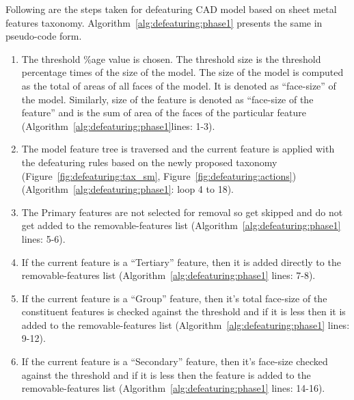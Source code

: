 
Following are the steps taken for defeaturing CAD model based on sheet metal features taxonomy. Algorithm~\ref{alg:defeaturing:phase1} presents the same in pseudo-code form.

\begin{enumerate}
[noitemsep,topsep=2pt,parsep=2pt,partopsep=2pt]
\item The threshold \%age value is chosen. The threshold size is the threshold percentage times of the size of the model. The size of the model  is computed as the total of areas of all faces of the model. It is denoted as ``face-size'' of the model. Similarly, size of the feature is denoted as ``face-size of the feature'' and is the sum of area of the faces of the particular feature (Algorithm~\ref{alg:defeaturing:phase1}lines: 1-3).
\item The model feature tree is traversed and the current feature is applied with the defeaturing rules based on the newly proposed taxonomy (Figure~\ref{fig:defeaturing:tax_sm}, Figure~\ref{fig:defeaturing:actions}) (Algorithm~\ref{alg:defeaturing:phase1}: loop 4 to 18). 
\item The Primary features are not selected for removal so get skipped and do not get added to the removable-features list  (Algorithm~\ref{alg:defeaturing:phase1} lines: 5-6).
\item If the current feature is a ``Tertiary'' feature, then it is added directly to the removable-features list (Algorithm~\ref{alg:defeaturing:phase1} lines: 7-8).
\item If the current feature is a ``Group'' feature, then it's total face-size of the constituent features is checked against the threshold and if it is less then it is added to the removable-features list (Algorithm~\ref{alg:defeaturing:phase1} lines: 9-12).
\item If the current feature is a ``Secondary'' feature, then it's face-size checked against the threshold and if it is less then the feature is added to the removable-features list  (Algorithm~\ref{alg:defeaturing:phase1} lines: 14-16). 


\end{enumerate}
